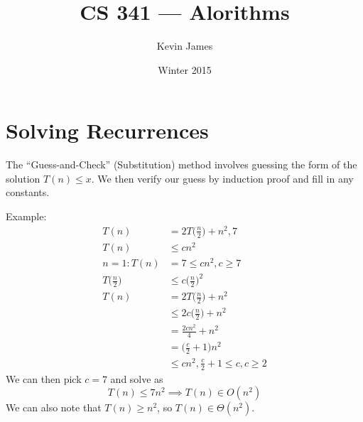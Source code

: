 \documentclass[12pt]{article}
\begin{document}
\title{CS 341 --- Alorithms}
\author{Kevin James}
\date{\vspace{-2ex}Winter 2015}
\maketitle\HRule

\tableofcontents
\newpage

\section{Solving Recurrences}
The ``Guess-and-Check'' (Substitution) method involves guessing the form of the solution $T(n) \leq x$. We then verify our guess by induction proof and fill in any constants.

Example:
\begin{align*}
T(n) &= 2T\bigg(\frac{n}{2}\bigg) + n^2, 7 \\
T(n) &\leq cn^2 \\
n = 1: T(n) &= 7 \leq cn^2, c \geq 7 \\
T\bigg(\frac{n}{2}\bigg) &\leq c\bigg(\frac{n}{2}\bigg)^2 \\
T(n) &= 2T\bigg(\frac{n}{2}\bigg) + n^2 \\
     &\leq 2c\bigg(\frac{n}{2}\bigg) + n^2 \\
     &= \frac{2cn^2}{4} + n^2 \\
     &= \bigg(\frac{c}{2} + 1\bigg)n^2 \\
     &\leq cn^2, \frac{c}{2} + 1 \leq c, c \geq 2
\end{align*}
We can then pick $c = 7$ and solve as \[ T(n) \leq 7n^2 \implies T(n) \in O(n^2) \] We can also note that $T(n) \geq n^2$, so $T(n) \in \Theta(n^2)$.
\end{document}
